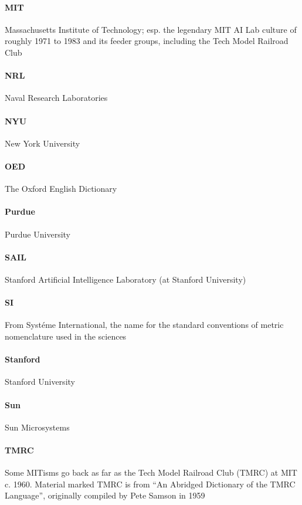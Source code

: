 \begin{multicols}{2}
	\paragraph{MIT} Massachusetts Institute of Technology; esp. the legendary MIT AI Lab culture of roughly 1971 to 1983 and its feeder
		groups, including the Tech Model Railroad Club
	
	\paragraph{NRL} Naval Research Laboratories

	\paragraph{NYU} New York University

	\paragraph{OED} The Oxford English Dictionary

	\paragraph{Purdue} Purdue University

	\paragraph{SAIL} Stanford Artificial Intelligence Laboratory (at Stanford University)

	\paragraph{SI} From Syst\'{e}me International, the name for the standard conventions of metric nomenclature used in the sciences

	\paragraph{Stanford} Stanford University

	\paragraph{Sun} Sun Microsystems

	\paragraph{TMRC} Some MITisms go back as far as the Tech Model Railroad Club (TMRC) at MIT c. 1960. Material marked TMRC is from ``An
		Abridged Dictionary of the TMRC Language'', originally compiled by Pete Samson in 1959


\end{multicols}
